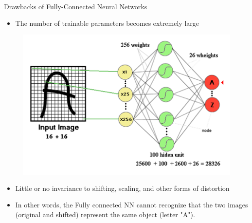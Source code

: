 \documentclass[10pt]{beamer}
\theoremstyle{remark}
\theoremstyle{definition}
\begin{document}
\begin{frame}[allowframebreaks]{Drawbacks of Fully-Connected Neural Networks}
\begin{itemize}
    \item The number of trainable parameters becomes extremely large
\end{itemize}

\begin{figure}
\centering
\includegraphics[width=1.0\textwidth,height=0.8\textheight,keepaspectratio]{./images/nn_2.png}
\end{figure}




\framebreak

\begin{itemize}
    \item Little or no invariance to shifting, scaling, and other forms of distortion

    \item In other words, the Fully connected NN cannot recognize that the two images (original and shifted) represent the same object (letter "A").
\end{itemize}


\end{frame}
\end{document}
